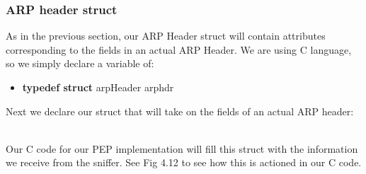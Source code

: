 \documentclass{uathesis}
\begin{document}
\subsubsection*{ARP header struct}
As in the previous section, our ARP Header struct will contain attributes corresponding to the fields in an actual ARP Header. We are using C language, so we simply declare a variable of:\\

\begin{itemize}
\item \textbf{typedef struct} arpHeader arphdr\\
\end{itemize}

Next we declare our struct that will take on the fields of an actual ARP header:

\\

Our C code for our PEP implementation will fill this struct with the information we receive from the sniffer. See Fig 4.12 to see how this is actioned in our C code. \\
\end{document}
